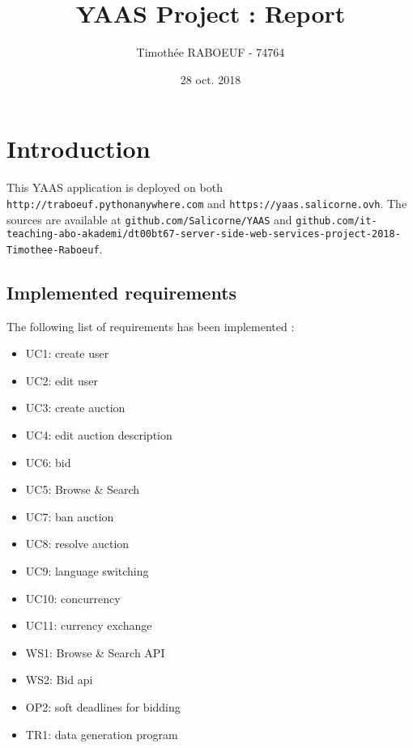 \documentclass[a4paper, 11pt]{report}
\title{YAAS Project : Report}
\author{Timothée RABOEUF - 74764}
\date{28 oct. 2018}
\begin{document}
 
\maketitle
\tableofcontents
    
\chapter{Introduction}

    This YAAS application is deployed on both \texttt{http://traboeuf.pythonanywhere.com} and \texttt{https://yaas.salicorne.ovh}. The sources are available at \texttt{github.com/Salicorne/YAAS} and 
    \texttt{github.com/it-teaching-abo-akademi/dt00bt67-server-side-web-services-project-2018-Timothee-Raboeuf}. 

    \section{Implemented requirements}

    The following list of requirements has been implemented : 
    \begin{itemize}
        \item UC1: create user
        \item UC2: edit user
        \item UC3: create auction
        \item UC4: edit auction description
        \item UC6: bid
        \item UC5: Browse \& Search
        \item UC7: ban auction
        \item UC8: resolve auction
        \item UC9: language switching
        \item UC10: concurrency
        \item UC11: currency exchange
        \item WS1: Browse \& Search API
        \item WS2: Bid api
        \item OP2: soft deadlines for bidding
        \item TR1: data generation program

    \end{itemize}
\end{document}
